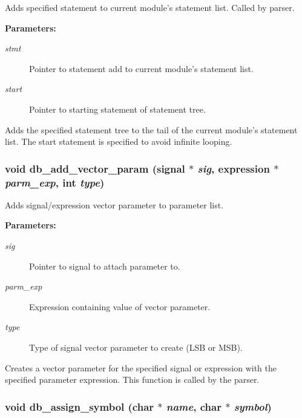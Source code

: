 Adds specified statement to current module's statement list. Called by parser.

\begin{Desc}
\item[{\bf Parameters: }]\par
\begin{description}
\item[
{\em stmt}]Pointer to statement add to current module's statement list. \item[
{\em start}]Pointer to starting statement of statement tree.

\end{description}
\end{Desc}
Adds the specified statement tree to the tail of the current module's statement list. The start statement is specified to avoid infinite looping. 
\subsubsection{\setlength{\rightskip}{0pt plus 5cm}void db\_\-add\_\-vector\_\-param ({\bf signal} $\ast$ {\em sig}, {\bf expression} $\ast$ {\em parm\_\-exp}, int {\em type})}\label{db_8h_a6}


Adds signal/expression vector parameter to parameter list.

\begin{Desc}
\item[{\bf Parameters: }]\par
\begin{description}
\item[
{\em sig}]Pointer to signal to attach parameter to. \item[
{\em parm\_\-exp}]Expression containing value of vector parameter. \item[
{\em type}]Type of signal vector parameter to create (LSB or MSB).

\end{description}
\end{Desc}
Creates a vector parameter for the specified signal or expression with the specified parameter expression. This function is called by the parser. 
\subsubsection{\setlength{\rightskip}{0pt plus 5cm}void db\_\-assign\_\-symbol (char $\ast$ {\em name}, char $\ast$ {\em symbol})}\label{db_8h_a22}


